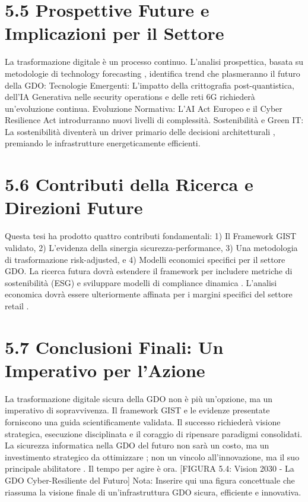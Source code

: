 \section{5.5 Prospettive Future e Implicazioni per il Settore}

La trasformazione digitale è un processo continuo. L'analisi prospettica, basata su metodologie di technology forecasting \autocite{linstone2002,martino1993}, identifica trend che plasmeranno il futuro della GDO:
Tecnologie Emergenti: L'impatto della crittografia post-quantistica, dell'IA Generativa nelle security operations e delle reti 6G richiederà un'evoluzione continua.
Evoluzione Normativa: L'AI Act Europeo e il Cyber Resilience Act \autocite{ec2024digital} introdurranno nuovi livelli di complessità.
Sostenibilità e Green IT: La sostenibilità diventerà un driver primario delle decisioni architetturali \autocite{greengrid2024}, premiando le infrastrutture energeticamente efficienti.

\section{5.6 Contributi della Ricerca e Direzioni Future}

Questa tesi ha prodotto quattro contributi fondamentali: 1) Il Framework GIST validato, 2) L'evidenza della sinergia sicurezza-performance, 3) Una metodologia di trasformazione risk-adjusted, e 4) Modelli economici specifici per il settore GDO. La ricerca futura dovrà estendere il framework per includere metriche di sostenibilità (ESG) \autocite{eurostat2024} e sviluppare modelli di compliance dinamica \autocite{parmenter2019}. L'analisi economica dovrà essere ulteriormente affinata per i margini specifici del settore retail \autocite{bcg2024,mckinsey2024digital,accenture2024tech}.

\section{5.7 Conclusioni Finali: Un Imperativo per l'Azione}

La trasformazione digitale sicura della GDO non è più un'opzione, ma un imperativo di sopravvivenza. Il framework GIST e le evidenze presentate forniscono una guida scientificamente validata. Il successo richiederà visione strategica, esecuzione disciplinata \autocite{mckinsey2023} e il coraggio di ripensare paradigmi consolidati. La sicurezza informatica nella GDO del futuro non sarà un costo, ma un investimento strategico da ottimizzare \autocite{forrester2024cloud}; non un vincolo all'innovazione, ma il suo principale abilitatore \autocite{gartner2024market}. Il tempo per agire è ora.
[FIGURA 5.4: Vision 2030 - La GDO Cyber-Resiliente del Futuro]
Nota: Inserire qui una figura concettuale che riassuma la visione finale di un'infrastruttura GDO sicura, efficiente e innovativa.

